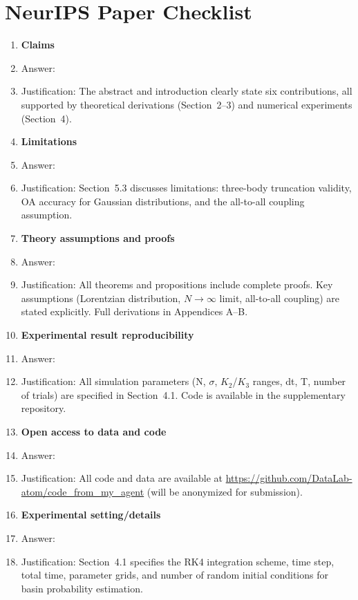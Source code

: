 \section*{NeurIPS Paper Checklist}

\begin{enumerate}

\item {\bf Claims}
    \item[] Answer: \answerYes{}
    \item[] Justification: The abstract and introduction clearly state six contributions, all supported by theoretical derivations (Section~2--3) and numerical experiments (Section~4).

\item {\bf Limitations}
    \item[] Answer: \answerYes{}
    \item[] Justification: Section~5.3 discusses limitations: three-body truncation validity, OA accuracy for Gaussian distributions, and the all-to-all coupling assumption.

\item {\bf Theory assumptions and proofs}
    \item[] Answer: \answerYes{}
    \item[] Justification: All theorems and propositions include complete proofs. Key assumptions (Lorentzian distribution, $N\to\infty$ limit, all-to-all coupling) are stated explicitly. Full derivations in Appendices A--B.

\item {\bf Experimental result reproducibility}
    \item[] Answer: \answerYes{}
    \item[] Justification: All simulation parameters (N, $\sigma$, $K_2$/$K_3$ ranges, dt, T, number of trials) are specified in Section~4.1. Code is available in the supplementary repository.

\item {\bf Open access to data and code}
    \item[] Answer: \answerYes{}
    \item[] Justification: All code and data are available at \url{https://github.com/DataLab-atom/code_from_my_agent} (will be anonymized for submission).

\item {\bf Experimental setting/details}
    \item[] Answer: \answerYes{}
    \item[] Justification: Section~4.1 specifies the RK4 integration scheme, time step, total time, parameter grids, and number of random initial conditions for basin probability estimation.


\end{enumerate}
